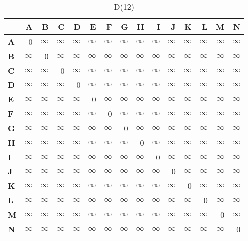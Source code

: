 \documentclass{article}
\newcommand{\INF}{$\infty$}
\begin{document}
\begin{table}[H]\centering
\caption{D(12)}
\begin{tabular}{l r r r r r r r r r r r r r r}
\toprule
 & \textbf{A} & \textbf{B} & \textbf{C} & \textbf{D} & \textbf{E} & \textbf{F} & \textbf{G} & \textbf{H} & \textbf{I} & \textbf{J} & \textbf{K} & \textbf{L} & \textbf{M} & \textbf{N}\\\midrule
\textbf{A} & 0 & \INF & \INF & \INF & \INF & \INF & \INF & \INF & \INF & \INF & \INF & \INF & \INF & \INF \\
\textbf{B} & \INF & 0 & \INF & \INF & \INF & \INF & \INF & \INF & \INF & \INF & \INF & \INF & \INF & \INF \\
\textbf{C} & \INF & \INF & 0 & \INF & \INF & \INF & \INF & \INF & \INF & \INF & \INF & \INF & \INF & \INF \\
\textbf{D} & \INF & \INF & \INF & 0 & \INF & \INF & \INF & \INF & \INF & \INF & \INF & \INF & \INF & \INF \\
\textbf{E} & \INF & \INF & \INF & \INF & 0 & \INF & \INF & \INF & \INF & \INF & \INF & \INF & \INF & \INF \\
\textbf{F} & \INF & \INF & \INF & \INF & \INF & 0 & \INF & \INF & \INF & \INF & \INF & \INF & \INF & \INF \\
\textbf{G} & \INF & \INF & \INF & \INF & \INF & \INF & 0 & \INF & \INF & \INF & \INF & \INF & \INF & \INF \\
\textbf{H} & \INF & \INF & \INF & \INF & \INF & \INF & \INF & 0 & \INF & \INF & \INF & \INF & \INF & \INF \\
\textbf{I} & \INF & \INF & \INF & \INF & \INF & \INF & \INF & \INF & 0 & \INF & \INF & \INF & \INF & \INF \\
\textbf{J} & \INF & \INF & \INF & \INF & \INF & \INF & \INF & \INF & \INF & 0 & \INF & \INF & \INF & \INF \\
\textbf{K} & \INF & \INF & \INF & \INF & \INF & \INF & \INF & \INF & \INF & \INF & 0 & \INF & \INF & \INF \\
\textbf{L} & \INF & \INF & \INF & \INF & \INF & \INF & \INF & \INF & \INF & \INF & \INF & 0 & \INF & \INF \\
\textbf{M} & \INF & \INF & \INF & \INF & \INF & \INF & \INF & \INF & \INF & \INF & \INF & \INF & 0 & \INF \\
\textbf{N} & \INF & \INF & \INF & \INF & \INF & \INF & \INF & \INF & \INF & \INF & \INF & \INF & \INF & 0 \\
\bottomrule
\end{tabular}
\end{table}
\end{document}
